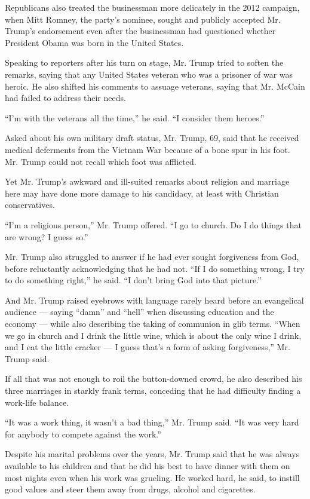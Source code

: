 Republicans also treated the businessman more delicately in the 2012
campaign, when Mitt Romney, the party's nominee, sought and publicly
accepted Mr. Trump's endorsement even after the businessman had
questioned whether President Obama was born in the United States.

Speaking to reporters after his turn on stage, Mr. Trump tried to soften
the remarks, saying that any United States veteran who was a prisoner of
war was heroic. He also shifted his comments to assuage veterans, saying
that Mr. McCain had failed to address their needs.

``I'm with the veterans all the time,'' he said. ``I consider them
heroes.''

Asked about his own military draft status, Mr. Trump, 69, said that he
received medical deferments from the Vietnam War because of a bone spur
in his foot. Mr. Trump could not recall which foot was afflicted.

Yet Mr. Trump's awkward and ill-suited remarks about religion and
marriage here may have done more damage to his candidacy, at least with
Christian conservatives.

``I'm a religious person,'' Mr. Trump offered. ``I go to church. Do I do
things that are wrong? I guess so.''

Mr. Trump also struggled to answer if he had ever sought forgiveness
from God, before reluctantly acknowledging that he had not. ``If I do
something wrong, I try to do something right,'' he said. ``I don't bring
God into that picture.''

And Mr. Trump raised eyebrows with language rarely heard before an
evangelical audience --- saying ``damn'' and ``hell'' when discussing
education and the economy --- while also describing the taking of
communion in glib terms. ``When we go in church and I drink the little
wine, which is about the only wine I drink, and I eat the little cracker
--- I guess that's a form of asking forgiveness,'' Mr. Trump said.

If all that was not enough to roil the button-downed crowd, he also
described his three marriages in starkly frank terms, conceding that he
had difficulty finding a work-life balance.

``It was a work thing, it wasn't a bad thing,'' Mr. Trump said. ``It was
very hard for anybody to compete against the work.''

Despite his marital problems over the years, Mr. Trump said that he was
always available to his children and that he did his best to have dinner
with them on most nights even when his work was grueling. He worked
hard, he said, to instill good values and steer them away from drugs,
alcohol and cigarettes.

